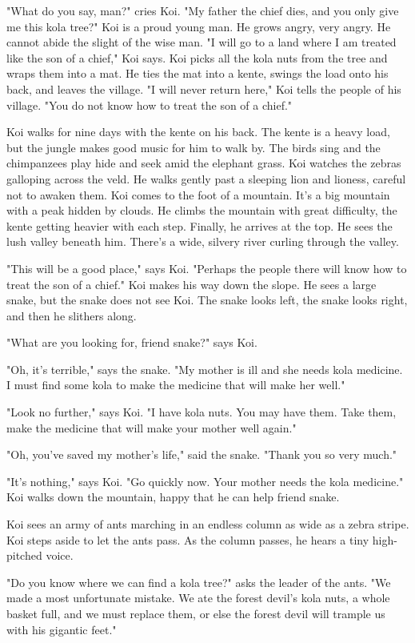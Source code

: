 "What do you say, man?" cries Koi. "My father the chief dies, and you only give me this kola tree?" Koi is a proud young man. He grows angry, very angry. He cannot abide the slight of the wise man. "I will go to a land where I am treated like the son of a chief," Koi says. Koi picks all the kola nuts from the tree and wraps them into a mat. He ties the mat into a kente, swings the load onto his back, and leaves the village. "I will never return here," Koi tells the people of his village. "You do not know how to treat the son of a chief."

Koi walks for nine days with the kente on his back. The kente is a heavy load, but the jungle makes good music for him to walk by. The birds sing and the chimpanzees play hide and seek amid the elephant grass. Koi watches the zebras galloping across the veld. He walks gently past a sleeping lion and lioness, careful not to awaken them. Koi comes to the foot of a mountain. It's a big mountain with a peak hidden by clouds. He climbs the mountain with great difficulty, the kente getting heavier with each step. Finally, he arrives at the top. He sees the lush valley beneath him. There's a wide, silvery river curling through the valley.

"This will be a good place," says Koi. "Perhaps the people there will know how to treat the son of a chief." Koi makes his way down the slope. He sees a large snake, but the snake does not see Koi. The snake looks left, the snake looks right, and then he slithers along.

"What are you looking for, friend snake?" says Koi.

"Oh, it's terrible," says the snake. "My mother is ill and she needs kola medicine. I must find some kola to make the medicine that will make her well."

"Look no further," says Koi. "I have kola nuts. You may have them. Take them, make the medicine that will make your mother well again."

"Oh, you've saved my mother's life," said the snake. "Thank you so very much."

"It's nothing," says Koi. "Go quickly now. Your mother needs the kola medicine." Koi walks down the mountain, happy that he can help friend snake.

Koi sees an army of ants marching in an endless column as wide as a zebra stripe. Koi steps aside to let the ants pass. As the column passes, he hears a tiny high-pitched voice.

"Do you know where we can find a kola tree?" asks the leader of the ants. "We made a most unfortunate mistake. We ate the forest devil's kola nuts, a whole basket full, and we must replace them, or else the forest devil will trample us with his gigantic feet."


